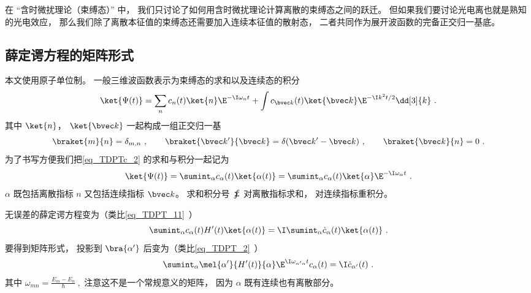 

在 “含时微扰理论（束缚态）” 中， 我们只讨论了如何用含时微扰理论计算离散的束缚态之间的跃迁。 但如果我们要讨论光电离也就是熟知的光电效应， 那么我们除了离散本征值的束缚态还需要加入连续本征值的散射态， 二者共同作为展开波函数的完备正交归一基底。

\subsection{薛定谔方程的矩阵形式}
本文使用原子单位制。 一般三维波函数表示为束缚态的求和以及连续态的积分
\begin{equation}\label{eq_TDPTc_2}
\ket{\Psi(t)} = \sum_n c_n(t)\ket{n}\E^{-\I\omega_n t} + \int c_{\bvec k}(t)\ket{\bvec k}\E^{-\I k^2 t/2} \dd[3]{k}~.
\end{equation}
其中 $\ket{n}$， $\ket{\bvec k}$ 一起构成一组正交归一基
\begin{equation}
\braket{m}{n} = \delta_{m,n}~, \qquad
\braket{\bvec k'}{\bvec k} = \delta(\bvec k' - \bvec k)~, \qquad
\braket{\bvec k}{n} = 0~.
\end{equation}
为了书写方便我们把\autoref{eq_TDPTc_2} 的求和与积分一起记为
\begin{equation}
\ket{\Psi(t)} = \sumint_\alpha c_\alpha(t) \ket{\alpha(t)} = \sumint_\alpha c_\alpha(t) \ket{\alpha}\E^{-\I\omega_\alpha t} ~.
\end{equation}
$\alpha$ 既包括离散指标 $n$ 又包括连续指标 $\bvec k$。 求和积分号 $\sumint$ 对离散指标求和， 对连续指标重积分。

无误差的薛定谔方程变为（类比\autoref{eq_TDPT_11}~）
\begin{equation}
\sumint_\alpha c_\alpha(t) H'(t) \ket{\alpha(t)} = \I \sumint_\alpha \dot c_\alpha(t) \ket{\alpha(t)}~.
\end{equation}
要得到矩阵形式， 投影到 $\bra{\alpha'}$ 后变为（类比\autoref{eq_TDPT_2}~）
\begin{equation}
\sumint_\alpha \mel{\alpha'}{H'(t)}{\alpha} \E^{\I \omega_{\alpha'\alpha} t} c_\alpha(t)
= \I \dot c_{\alpha'} (t)~.
\end{equation}
其中 $\begin{equation}
\omega_{mn} = \frac{E_m-E_n}{\hbar}~,
\end{equation}$ 注意这不是一个常规意义的矩阵， 因为 $\alpha$ 既有连续也有离散部分。

